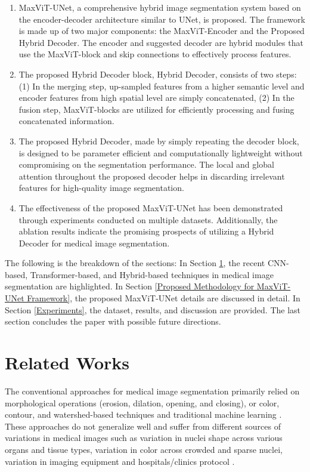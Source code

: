 \documentclass{article}
\begin{document}
\begin{enumerate}
\item MaxViT-UNet, a comprehensive hybrid image segmentation system based on the encoder-decoder architecture similar to UNet, is proposed. The framework is made up of two major components: the MaxViT-Encoder and the Proposed Hybrid Decoder. The encoder and suggested decoder are hybrid modules that use the MaxViT-block and skip connections to effectively process features.
\item The proposed Hybrid Decoder block, Hybrid Decoder, consists of two steps: (1) In the merging step, up-sampled features from a higher semantic level and encoder features from high spatial level are simply concatenated, (2) In the fusion step, MaxViT-blocks are utilized for efficiently processing and fusing concatenated information.
\item The proposed Hybrid Decoder, made by simply repeating the decoder block, is designed to be parameter efficient and computationally lightweight without compromising on the segmentation performance. The local and global attention throughout the proposed decoder helps in discarding irrelevant features for high-quality image segmentation.
\item The effectiveness of the proposed MaxViT-UNet has been demonstrated through experiments conducted on multiple datasets. Additionally, the ablation results indicate the promising prospects of utilizing a Hybrid Decoder for medical image segmentation.
\end{enumerate}

The following is the breakdown of the sections: In Section \ref{Related Works}, the recent CNN-based, Transformer-based, and Hybrid-based techniques in medical image segmentation are highlighted. In Section \ref{Proposed Methodology for MaxViT-UNet Framework}, the proposed MaxViT-UNet details are discussed in detail. In Section \ref{Experiments}, the dataset, results, and discussion are provided. The last section concludes the paper with possible future directions.

\section{Related Works}\label{Related Works}

The conventional approaches for medical image segmentation primarily relied on morphological operations (erosion, dilation, opening, and closing), or color, contour, and watershed-based techniques and traditional machine learning \cite{yang2006nuclei, veta2013automatic, tsai2003shape, held1997markov}. These approaches do not generalize well and suffer from different sources of variations in medical images such as variation in nuclei shape across various organs and tissue types, variation in color across crowded and sparse nuclei, variation in imaging equipment and hospitals/clinics protocol \cite{kumar2019multi}.
\end{document}
